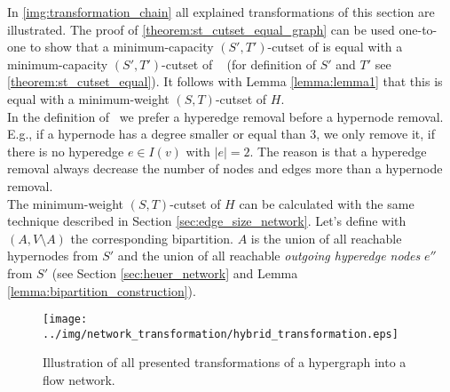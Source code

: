 In \autoref{img:transformation_chain} all explained transformations of this section are illustrated.
The proof of \autoref{theorem:st_cutset_equal_graph} can be used one-to-one to show that a minimum-capacity
$(S',T')$-cutset of  is equal with a minimum-capacity $(S',T')$-cutset of \ShortHybrid~
(for definition of $S'$ and $T'$ see \autoref{theorem:st_cutset_equal}). It follows with Lemma \ref{lemma:lemma1}
that this is equal with a minimum-weight $(S,T)$-cutset of $H$. \\
In the definition of \ShortHybrid~we prefer a hyperedge removal before a hypernode removal. E.g., if
a hypernode has a degree smaller or equal than $3$, we only remove it, if there is no hyperedge
$e \in I(v)$ with $|e| = 2$. The reason is that a hyperedge removal always decrease the number of nodes
and edges more than a hypernode removal. \\
The minimum-weight $(S,T)$-cutset of $H$ can be calculated with the same technique described in Section
\ref{sec:edge_size_network}. Let's define with $(A,V\setminus A)$ the corresponding bipartition.
$A$ is the union of all reachable hypernodes from $S'$ and the union of
all reachable \emph{outgoing hyperedge nodes} $e''$ from $S'$ (see Section \ref{sec:heuer_network} 
and Lemma \ref{lemma:bipartition_construction}).



\begin{figure}
\centering
\texttt{[image: ../img/network\_transformation/hybrid\_transformation.eps]}
\caption{Illustration of all presented transformations of a hypergraph into a flow network.}
\label{img:transformation_chain}
\end{figure}
